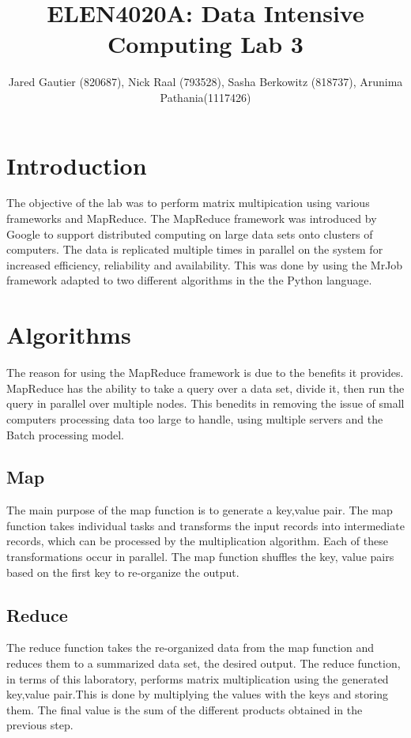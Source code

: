 \documentclass[twocolumn]{IEEEtran}
\title{ELEN4020A: Data Intensive Computing Lab 3}
\author{Jared Gautier (820687), Nick Raal (793528), Sasha Berkowitz (818737), Arunima Pathania(1117426)}
\begin{document}
	\maketitle
	
	\section{Introduction}
	The objective of the lab was to perform matrix multipication using various frameworks and MapReduce. The MapReduce framework was introduced by Google to support distributed computing on large data sets onto clusters of computers. The data is replicated multiple times in parallel on the system for increased efficiency, reliability and availability. This was done by using the MrJob framework adapted to two different algorithms in the the Python language.
	
	
	\section{Algorithms}
	The reason for using the MapReduce framework is due to the benefits it provides. MapReduce has the ability to take a query over a data set, divide it, then run the query in parallel over multiple nodes. This benedits in removing the issue of small computers processing data too large to handle, using multiple servers and the Batch processing model.
	
	\subsection{Map}
	The main purpose of the map function is to generate a key,value pair.  The map function takes individual tasks and transforms the input records into intermediate records, which can be processed by the multiplication algorithm. Each of these transformations occur in parallel. The map function shuffles the key, value pairs based on the first key to re-organize the output. 
	
	
	
	\subsection{Reduce}
	The reduce function takes the re-organized data from the map function and reduces them to a summarized data set, the desired output. The reduce function, in terms of this laboratory, performs matrix multiplication using the generated key,value pair.This is done by multiplying the values with the keys and storing them. The final value is the sum of the different products obtained in the previous step.
	
\end{document}
